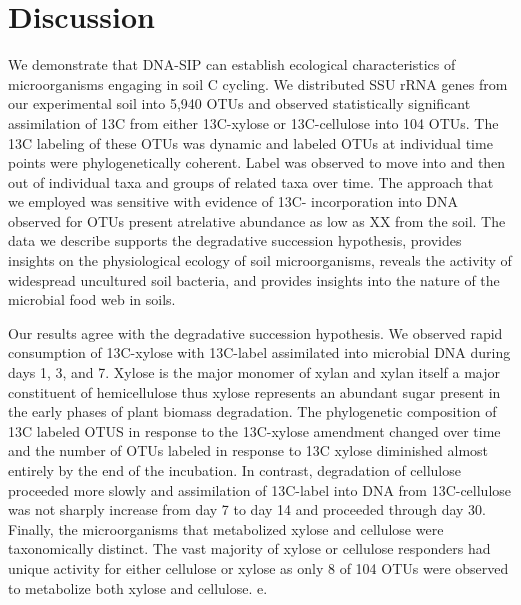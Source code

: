\section{Discussion} 
We demonstrate that DNA-SIP can establish ecological characteristics of
microorganisms engaging in soil C cycling. We distributed SSU rRNA genes from
our experimental soil into 5,940 OTUs and observed statistically significant
assimilation of 13C from either 13C-xylose or 13C-cellulose into 104 OTUs. The
13C labeling of these OTUs was dynamic and labeled OTUs at individual time
points were phylogenetically coherent. Label was observed to move into and then
out of individual taxa and groups of related taxa over time. The approach that
we employed was sensitive with evidence of 13C- incorporation into DNA observed
for OTUs present atrelative abundance as low as XX%
from the soil. The data we describe supports the degradative succession
hypothesis, provides insights on the physiological ecology of soil
microorganisms, reveals the activity of widespread uncultured soil bacteria,
and provides insights into the nature of the microbial food web in soils. 

Our results agree with the degradative succession hypothesis. We observed rapid
consumption of 13C-xylose with 13C-label assimilated into microbial DNA during
days 1, 3, and 7. Xylose is the major monomer of xylan and xylan itself a major
constituent of hemicellulose thus xylose represents an abundant sugar present
in the early phases of plant biomass degradation. The phylogenetic composition
of 13C labeled OTUS in response to the  13C-xylose amendment changed over time
and the number of OTUs labeled in response to 13C xylose diminished almost
entirely by the end of the incubation. In contrast, degradation of cellulose
proceeded more slowly and assimilation of 13C-label into DNA from 13C-cellulose
was not sharply increase from day 7 to day 14 and proceeded through day 30.
Finally, the microorganisms that metabolized xylose and cellulose were
taxonomically distinct. The vast majority of xylose or cellulose responders had
unique activity for either cellulose or xylose as only 8 of 104 OTUs were
observed to metabolize both xylose and cellulose. e. 

